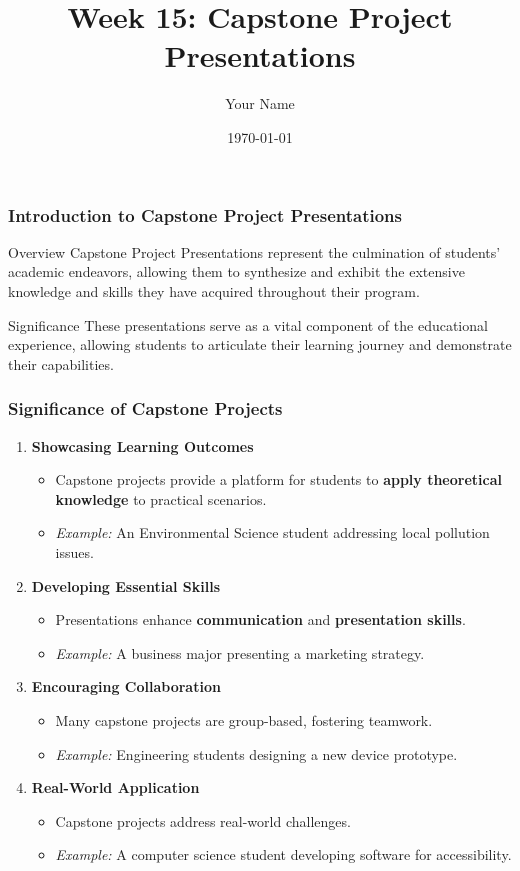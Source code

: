 \documentclass{beamer}
\title{Week 15: Capstone Project Presentations}
\author{Your Name}
\institute{Your Institution}
\date{\today}
\begin{document}
\frame{\titlepage}

\begin{frame}[fragile]
    \frametitle{Introduction to Capstone Project Presentations}
    \begin{block}{Overview}
        Capstone Project Presentations represent the culmination of students' academic endeavors, allowing them to synthesize and exhibit the extensive knowledge and skills they have acquired throughout their program.
    \end{block}
    \begin{block}{Significance}
        These presentations serve as a vital component of the educational experience, allowing students to articulate their learning journey and demonstrate their capabilities.
    \end{block}
\end{frame}

\begin{frame}[fragile]
    \frametitle{Significance of Capstone Projects}
    \begin{enumerate}
        \item \textbf{Showcasing Learning Outcomes}
        \begin{itemize}
            \item Capstone projects provide a platform for students to \textbf{apply theoretical knowledge} to practical scenarios.
            \item \textit{Example:} An Environmental Science student addressing local pollution issues.
        \end{itemize}
        
        \item \textbf{Developing Essential Skills}
        \begin{itemize}
            \item Presentations enhance \textbf{communication} and \textbf{presentation skills}.
            \item \textit{Example:} A business major presenting a marketing strategy.
        \end{itemize}
        
        \item \textbf{Encouraging Collaboration}
        \begin{itemize}
            \item Many capstone projects are group-based, fostering teamwork.
            \item \textit{Example:} Engineering students designing a new device prototype.
        \end{itemize}
        
        \item \textbf{Real-World Application}
        \begin{itemize}
            \item Capstone projects address real-world challenges.
            \item \textit{Example:} A computer science student developing software for accessibility.
        \end{itemize}
    \end{enumerate}
\end{frame}
\end{document}
